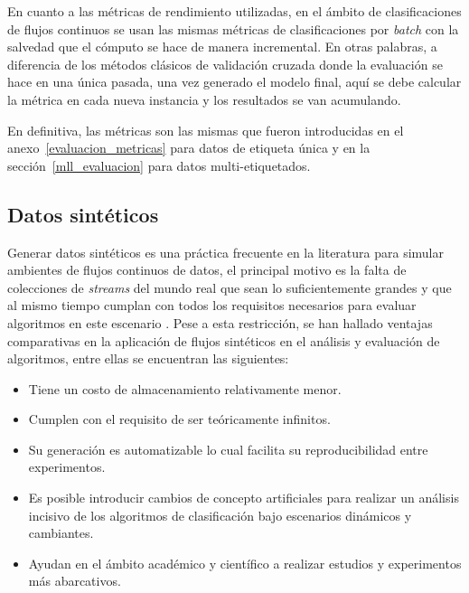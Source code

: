 En cuanto a las métricas de rendimiento utilizadas, en el ámbito de
clasificaciones de flujos continuos se usan las mismas métricas de
clasificaciones por \textit{batch} con la salvedad que el cómputo se hace de
manera incremental. En otras palabras, a diferencia de los métodos clásicos de
validación cruzada donde la evaluación se hace en una única pasada, una vez
generado el modelo final, aquí se debe calcular la métrica en cada nueva
instancia y los resultados se van acumulando.

En definitiva, las métricas son las mismas que fueron introducidas en el
anexo~\ref{evaluacion_metricas} para datos de etiqueta única y en la
sección~\ref{mll_evaluacion} para datos multi-etiquetados.

\subsection{Datos sintéticos}
\label{stream_syn}

Generar datos sintéticos es una práctica frecuente en la literatura para simular
ambientes de flujos continuos de datos, el principal motivo es la falta de
colecciones de \textit{streams} del mundo real que sean lo suficientemente
grandes y que al mismo tiempo cumplan con todos los requisitos necesarios para
evaluar algoritmos en este escenario \cite{kirkby_improving_2007}. Pese a esta
restricción, se han hallado ventajas comparativas en la aplicación de flujos
sintéticos en el análisis y evaluación de algoritmos, entre ellas se encuentran
las siguientes:

\begin{itemize}

	\item Tiene un costo de almacenamiento relativamente menor.

	\item Cumplen con el requisito de ser teóricamente infinitos.

	\item Su generación es automatizable lo cual facilita su reproducibilidad
	      entre experimentos.

	\item Es posible introducir cambios de concepto artificiales para realizar un
	      análisis incisivo de los algoritmos de clasificación bajo escenarios
	      dinámicos y cambiantes.

	\item Ayudan en el ámbito académico y científico a realizar estudios y
	      experimentos más abarcativos.

\end{itemize}

